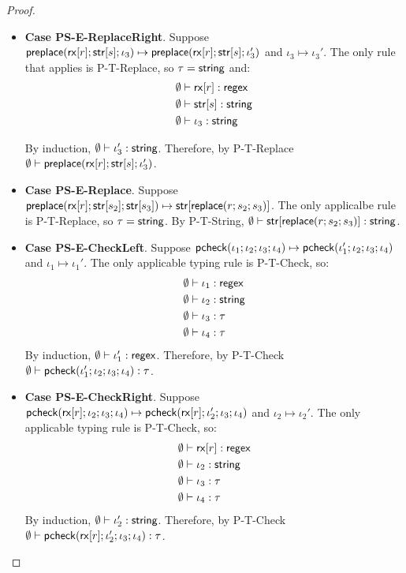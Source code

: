 \documentclass[11pt,leqno]{article}
\theoremstyle{definition}
\newcommand{\tcheck}[4]{{\sf pcheck}(#1; #2; #3; #4)}
\renewcommand{\tstr}[1]{{{\sf str}[#1]}}
\newcommand{\preplace}[3]{{\sf preplace}(#1;#2;#3)}
\newcommand{\rx}[1]{ {\sf rx}[#1] }
\newcommand{\str}{{\sf string}}
\newcommand{\regex}{{\sf regex}}
\newcommand{\lsubst}[3]{{\sf replace}(#1;#2;#3)} %
\begin{document}
\begin{proof}
\begin{itemize}[label=$ $,itemsep=1ex]
\item \textbf{Case PS-E-ReplaceRight}. 
Suppose $\preplace{\rx{r}}{\tstr{s}}{\iota_3} \mapsto \preplace{\rx{r}}{\tstr{s}}{\iota_3'}$
and $\iota_3 \mapsto \iota_3'$.
The only rule that applies is P-T-Replace, so $\tau=\str$ and:
\begin{align*}
  \emptyset &\vdash \rx{r} : \regex \\
  \emptyset &\vdash \tstr{s} : \str \\
  \emptyset &\vdash \iota_3 : \str
\end{align*}

By induction, $\emptyset \vdash \iota_3' : \str$.
Therefore, by P-T-Replace $\emptyset \vdash \preplace{\rx{r}}{\tstr{s}}{\iota_3'}$.

\item \textbf{Case PS-E-Replace}. 
Suppose $\preplace{\rx{r}}{\tstr{s_2}}{\tstr{s_3}} \mapsto \tstr{\lsubst{r}{s_2}{s_3}}$. The only applicalbe rule is P-T-Replace, so $\tau=\str$. By P-T-String, $\emptyset \vdash \tstr{\lsubst{r}{s_2}{s_3}} : \str$.

\item \textbf{Case PS-E-CheckLeft}. 
Suppose $\tcheck{\iota_1}{\iota_2}{\iota_3}{\iota_4} \mapsto \tcheck{\iota_1'}{\iota_2}{\iota_3}{\iota_4}$ and $\iota_1\mapsto\iota_1'$.
The only applicable typing rule is P-T-Check, so:
\begin{align*}
  \emptyset &\vdash \iota_1 : \regex \\
  \emptyset &\vdash \iota_2 : \str \\
  \emptyset &\vdash \iota_3 : \tau \\
  \emptyset &\vdash \iota_4 : \tau
\end{align*}
By induction, $\emptyset \vdash \iota_1' : \regex$. Therefore, by P-T-Check 
$\emptyset \vdash \tcheck{\iota_1'}{\iota_2}{\iota_3}{\iota_4} : \tau$.


\item \textbf{Case PS-E-CheckRight}. 
Suppose $\tcheck{\rx{r}}{\iota_2}{\iota_3}{\iota_4} \mapsto \tcheck{\rx{r}}{\iota_2'}{\iota_3}{\iota_4}$ and $\iota_2\mapsto\iota_2'$.
The only applicable typing rule is P-T-Check, so:
\begin{align*}
  \emptyset &\vdash \rx{r} : \regex \\
  \emptyset &\vdash \iota_2 : \str \\
  \emptyset &\vdash \iota_3 : \tau \\
  \emptyset &\vdash \iota_4 : \tau
\end{align*}
By induction, $\emptyset \vdash \iota_2' : \str$. Therefore, by P-T-Check 
$\emptyset \vdash \tcheck{\rx{r}}{\iota_2'}{\iota_3}{\iota_4} : \tau$.


\end{itemize}
\end{proof}
\end{document}
